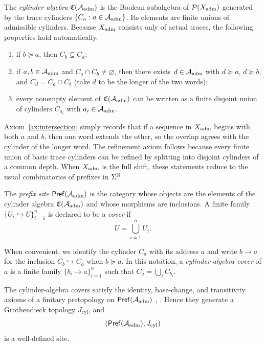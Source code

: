 \begin{definition}
\label{def:cylinder-algebra}
The \emph{cylinder algebra} $\mathfrak{C}(\mathcal{A}_{\mathrm{adm}})$ is the Boolean subalgebra of
$\mathcal{P}(X_{\mathrm{adm}})$ generated by the trace cylinders $\{C_a:a\in\mathcal{A}_{\mathrm{adm}}\}$.  Its
elements are finite unions of admissible cylinders.  Because $X_{\mathrm{adm}}$ consists
only of actual traces, the following properties hold automatically.
\begin{enumerate}[label=\textup{(CA\arabic*)}]
\item\label{ax:nesting} if $b\succeq a$, then $C_b\subseteq C_a$;
\item\label{ax:intersection} if $a,b\in\mathcal{A}_{\mathrm{adm}}$ and $C_a\cap C_b\neq\varnothing$,
then there exists $d\in\mathcal{A}_{\mathrm{adm}}$ with $d\succeq a$, $d\succeq b$, and
$C_d = C_a\cap C_b$ (take $d$ to be the longer of the two words);
\item\label{ax:refinement} every nonempty element of $\mathfrak{C}(\mathcal{A}_{\mathrm{adm}})$ can
be written as a finite disjoint union of cylinders $C_{a_i}$ with
$a_i\in\mathcal{A}_{\mathrm{adm}}$.
\end{enumerate}
\end{definition}

Axiom~\ref{ax:intersection} simply records that if a sequence in $X_{\mathrm{adm}}$
begins with both $a$ and $b$, then one word extends the other, so the overlap
agrees with the cylinder of the longer word.  The refinement axiom follows
because every finite union of basic trace cylinders can be refined by
splitting into disjoint cylinders of a common depth.  When $X_{\mathrm{adm}}$ is the full
shift, these statements reduce to the usual combinatorics of prefixes in
$\Sigma^{\mathbb{N}}$.

\begin{definition}
\label{def:prefix-site}
The \emph{prefix site} $\mathsf{Pref}(\mathcal{A}_{\mathrm{adm}})$ is the category whose objects
are the elements of the cylinder algebra $\mathfrak{C}(\mathcal{A}_{\mathrm{adm}})$ and whose
morphisms are inclusions.  A finite family $\{U_i\hookrightarrow U\}_{i=1}^n$
is declared to be a \emph{cover} if
\[
U = \bigcup_{i=1}^n U_i.
\]
\end{definition}

When convenient, we identify the cylinder $C_a$ with its address $a$ and write
$b\to a$ for the inclusion $C_b\hookrightarrow C_a$ when $b\succeq a$.  In
this notation, a \emph{cylinder-algebra cover} of $a$ is a finite family
$\{b_i\to a\}_{i=1}^n$ such that $C_a=\bigcup_i C_{b_i}$.

\begin{proposition}
\label{prop:prefix-site-grothendieck-topology}
The cylinder-algebra covers satisfy the identity, base-change, and transitivity axioms
of a finitary pretopology on $\mathsf{Pref}(\mathcal{A}_{\mathrm{adm}})$
\cite[Chapter~III]{MacLaneMoerdijk1992},
\cite[\S C2.1]{Johnstone2002Elephant}.  Hence they generate a
Grothendieck topology $J_{\mathrm{cyl}}$, and
\[
(\mathsf{Pref}(\mathcal{A}_{\mathrm{adm}}),J_{\mathrm{cyl}})
\]
is a well-defined site.
\end{proposition}

